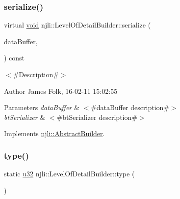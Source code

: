 \subsubsection{\texorpdfstring{serialize()}{serialize()}}
{\footnotesize\ttfamily virtual \mbox{\hyperlink{_thread_8h_af1e856da2e658414cb2456cb6f7ebc66}{void}} njli\+::\+Level\+Of\+Detail\+Builder\+::serialize (\begin{DoxyParamCaption}\item[{\mbox{\hyperlink{_thread_8h_af1e856da2e658414cb2456cb6f7ebc66}{void}} $\ast$}]{data\+Buffer,  }\item[{bt\+Serializer $\ast$}]{ }\end{DoxyParamCaption}) const\hspace{0.3cm}{\ttfamily [virtual]}}



$<$\#\+Description\#$>$ 

\begin{DoxyAuthor}{Author}
James Folk, 16-\/02-\/11 15\+:02\+:55
\end{DoxyAuthor}

\begin{DoxyParams}{Parameters}
{\em data\+Buffer} & $<$\#data\+Buffer description\#$>$ \\
\hline
{\em bt\+Serializer} & $<$\#bt\+Serializer description\#$>$ \\
\hline
\end{DoxyParams}


Implements \mbox{\hyperlink{classnjli_1_1_abstract_builder_ab66b774e02ccb9da554c9aab7fa6d981}{njli\+::\+Abstract\+Builder}}.

\mbox{\label{classnjli_1_1_level_of_detail_builder_a4ce3a6498f6e5208bab1f9ac7b9a8444}} 
\subsubsection{\texorpdfstring{type()}{type()}}
{\footnotesize\ttfamily static \mbox{\hyperlink{_util_8h_a10e94b422ef0c20dcdec20d31a1f5049}{u32}} njli\+::\+Level\+Of\+Detail\+Builder\+::type (\begin{DoxyParamCaption}{ }\end{DoxyParamCaption})\hspace{0.3cm}{\ttfamily [static]}}

